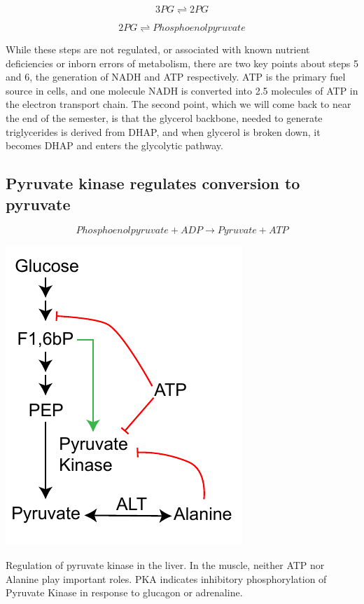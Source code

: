 \documentclass{tufte-handout}
\begin{document}
\begin{equation}
3PG \rightleftharpoons 2PG
\end{equation}

\begin{equation}
2PG \rightleftharpoons Phosphoenolpyruvate
\end{equation}

While these steps are not regulated, or associated with known nutrient deficiencies or inborn errors of metabolism, there are two key points about steps 5 and 6, the generation of NADH and ATP respectively.  ATP is the primary fuel source in cells, and one molecule NADH is converted into 2.5 molecules of ATP in the electron transport chain.  The second point, which we will come back to near the end of the semester, is that the glycerol backbone, needed to generate triglycerides is derived from DHAP, and when glycerol is broken down, it becomes DHAP and enters the glycolytic pathway.

\subsection{Pyruvate kinase regulates conversion to pyruvate}

\begin{equation}\label{eq:pk}
Phosphoenolpyruvate + ADP \rightarrow Pyruvate + ATP
\end{equation}

\begin{marginfigure}
\includegraphics{figures/pk-regulation.pdf}
\caption{Regulation of pyruvate kinase in the liver.  In the muscle, neither ATP nor Alanine play important roles.  PKA indicates inhibitory phosphorylation of Pyruvate Kinase in response to glucagon or adrenaline.}
\label{fig:pk-regulation}
\end{marginfigure}
\end{document}
